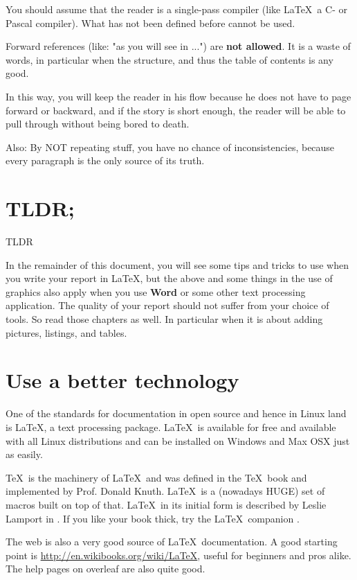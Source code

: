 You should assume that the reader is a single-pass compiler (like
\LaTeX\ a C- or Pascal compiler). What has not been defined before
cannot be used.

Forward references (like: "as you will see in ...") are \textbf{not
  allowed}. It is a waste of words, in particular when the structure,
and thus the table of contents is any good.

In this way, you will keep the reader in his flow because he does not
have to page forward or backward, and if the story is short enough,
the reader will be able to pull through without being bored to death.

Also: By NOT repeating stuff, you have no chance of inconsistencies,
because every paragraph is the only source of its truth.

\section{TLDR;}\gls{TLDR}

In the remainder of this document, you will see some tips and tricks to
use when you write your report in \LaTeX, but the above and some
things in the use of graphics also apply when you use \textbf{Word} or
some other text processing application. The quality of your report
should not suffer from your choice of tools. So read those chapters as
well. In particular when it is about adding pictures, listings, and
tables.


\section{Use a better technology}
One of the standards for documentation in open source and hence in
Linux land is \LaTeX, a text processing package. \LaTeX\ is available
for free and available with all Linux distributions and can be
installed on Windows and Max OSX just as easily.

\TeX\ is the machinery of \LaTeX\ and was defined in the \TeX\ book
\cite{texbook} and implemented by
Prof. Donald Knuth. \LaTeX\ is a (nowadays HUGE) set of macros built
on top of that. \LaTeX\ in its initial form is described by Leslie
Lamport in \cite{latexbook}. If you like your book thick, try the
\LaTeX\ companion \cite{latexcompanion}.

The web is also a very good source of \LaTeX\ documentation. A good
starting point is \url{http://en.wikibooks.org/wiki/LaTeX}, useful for
beginners and pros alike. The help pages on overleaf are also quite good.

